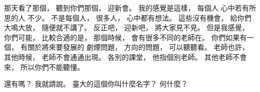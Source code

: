 \hypertarget{w01:cue:3233}{}那天看了那個，
\hypertarget{w01:cue:3234}{}聽到你們那個，
\hypertarget{w01:cue:3235}{}迎新會。
\hypertarget{w01:cue:3236}{}我的感覺是這樣，
\hypertarget{w01:cue:3237}{}每個人
\hypertarget{w01:cue:3238}{}心中若有所思的人
\hypertarget{w01:cue:3239}{}不少。
\hypertarget{w01:cue:3240}{}不是每個人，
\hypertarget{w01:cue:3241}{}很多人，
\hypertarget{w01:cue:3242}{}心中都有想法。
\hypertarget{w01:cue:3243}{}這些沒有機會，
\hypertarget{w01:cue:3244}{}給你們大鳴大放，
\hypertarget{w01:cue:3245}{}隨便就不講了。
\hypertarget{w01:cue:3246}{}反正吧，
\hypertarget{w01:cue:3247}{}迎新吧，
\hypertarget{w01:cue:3248}{}將大家見不見。
\hypertarget{w01:cue:3249}{}但是我感覺，
\hypertarget{w01:cue:3250}{}你們可能，
\hypertarget{w01:cue:3251}{}比較合適的是，
\hypertarget{w01:cue:3252}{}那個時候，
\hypertarget{w01:cue:3253}{}會有很多不同的老師在。
\hypertarget{w01:cue:3254}{}你們如果有一個，
\hypertarget{w01:cue:3255}{}有關於將來要發展的
\hypertarget{w01:cue:3256}{}劇煙問題，
\hypertarget{w01:cue:3257}{}方向的問題，
\hypertarget{w01:cue:3258}{}可以聽聽看。
\hypertarget{w01:cue:3259}{}老師也許，
\hypertarget{w01:cue:3260}{}其他時候，
\hypertarget{w01:cue:3261}{}老師不會通通出現。
\hypertarget{w01:cue:3262}{}各別的課堂，
\hypertarget{w01:cue:3263}{}他指個別老師。
\hypertarget{w01:cue:3264}{}其他老師不會來，
\hypertarget{w01:cue:3265}{}所以你們不能聽懂。

\hypertarget{w01:cue:3266}{}還有嗎？
\hypertarget{w01:cue:3267}{}我就請說。
\hypertarget{w01:cue:3268}{}臺大的這個你叫什麼名字？
\hypertarget{w01:cue:3269}{}何什麼？

